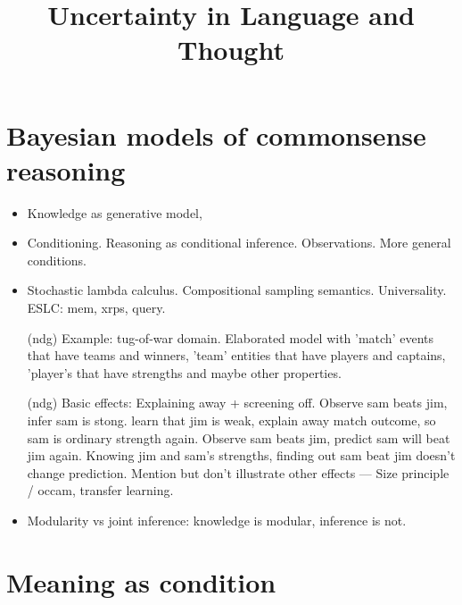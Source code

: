 \documentclass[12pt]{article}
\title{Uncertainty in Language and Thought}
\begin{document}


\maketitle

\abstract{}


\pagebreak

\tableofcontents

\pagebreak



\section{Bayesian models of commonsense reasoning}
\begin{itemize}

\item  Knowledge as generative model, 
  
\item  Conditioning. Reasoning as conditional inference. Observations. More general conditions.
  
\item  Stochastic lambda calculus. Compositional sampling semantics. Universality. 
\subitem ESLC: mem, xrps, query.
  
\item [(ndg)]  Example: tug-of-war domain. Elaborated model with 'match' events that have teams and winners, 'team' entities that have players and captains, 'player's that have strengths and maybe other properties. 
  
\item [(ndg)]  Basic effects: Explaining away + screening off. 
\subitem  Observe sam beats jim, infer sam is stong. learn that jim is weak, explain away match outcome, so sam is ordinary strength again.
\subitem  Observe sam beats jim, predict sam will beat jim again. Knowing jim and sam's strengths, finding out sam beat jim doesn't change prediction. 
\subitem   Mention but don't illustrate other effects ---  Size principle / occam, transfer learning.
  
\item  Modularity vs joint inference: knowledge is modular, inference is not.
  
\end{itemize}
 
 
 
\section{Meaning as condition}
 
\end{document}
